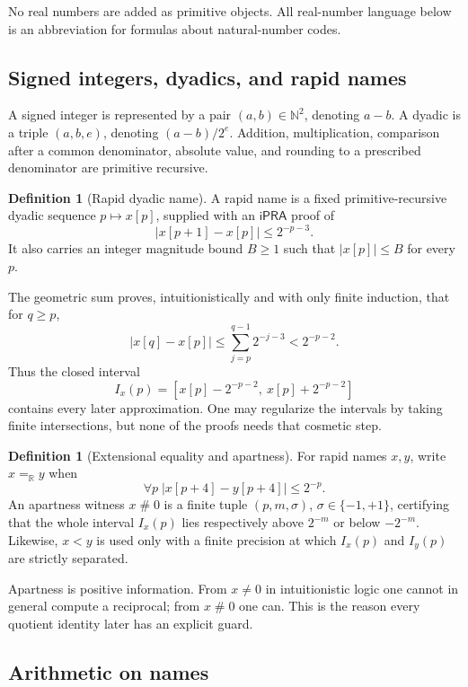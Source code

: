 \documentclass[11pt]{article}
\theoremstyle{definition}
\newtheorem{definition}[theorem]{Definition}
\newcommand{\N}{\mathbb N}
\newcommand{\R}{\mathbb R}
\newcommand{\iPRA}{\mathsf{iPRA}}
\newcommand{\apart}{\mathrel{\#}}
\newcommand{\abs}[1]{\left|#1\right|}
\begin{document}
No real numbers are added as primitive objects.  All real-number language below
is an abbreviation for formulas about natural-number codes.

\subsection{Signed integers, dyadics, and rapid names}

A signed integer is represented by a pair \((a,b)\in\N^2\), denoting \(a-b\).
A dyadic is a triple \((a,b,e)\), denoting \((a-b)/2^e\).  Addition,
multiplication, comparison after a common denominator, absolute value, and
rounding to a prescribed denominator are primitive recursive.

\begin{definition}[Rapid dyadic name]
A rapid name is a fixed primitive-recursive dyadic sequence
\(p\mapsto x[p]\), supplied with an \(\iPRA\) proof of
\[
  \abs{x[p+1]-x[p]}\le 2^{-p-3}.
  \tag{2.1}
\]
It also carries an integer magnitude bound \(B\ge1\) such that
\(\abs{x[p]}\le B\) for every \(p\).
\end{definition}

The geometric sum proves, intuitionistically and with only finite induction,
that for \(q\ge p\),
\[
 \abs{x[q]-x[p]}\le \sum_{j=p}^{q-1}2^{-j-3}<2^{-p-2}.
 \tag{2.2}
\]
Thus the closed interval
\[
 I_x(p)=[x[p]-2^{-p-2},\ x[p]+2^{-p-2}]
 \tag{2.3}
\]
contains every later approximation.  One may regularize the intervals by taking
finite intersections, but none of the proofs needs that cosmetic step.

\begin{definition}[Extensional equality and apartness]
For rapid names \(x,y\), write \(x=_\R y\) when
\[
  \forall p\;\abs{x[p+4]-y[p+4]}\le 2^{-p}.
  \tag{2.4}
\]
An apartness witness \(x\apart0\) is a finite tuple
\((p,m,\sigma)\), \(\sigma\in\{-1,+1\}\), certifying that the whole interval
\(I_x(p)\) lies respectively above \(2^{-m}\) or below \(-2^{-m}\).
Likewise, \(x<y\) is used only with a finite precision at which
\(I_x(p)\) and \(I_y(p)\) are strictly separated.
\end{definition}

Apartness is positive information.  From \(x\ne0\) in intuitionistic logic one
cannot in general compute a reciprocal; from \(x\apart0\) one can.  This is the
reason every quotient identity later has an explicit guard.

\subsection{Arithmetic on names}
\end{document}
